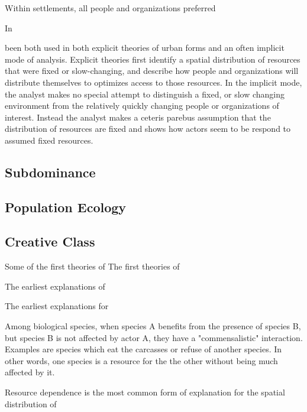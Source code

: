 Within settlements, all people and organizations
preferred 



In 



 been both used in both explicit theories of
urban forms and an often implicit mode of analysis. Explicit theories
first identify a spatial distribution of resources that were fixed or
slow-changing, and describe how people and organizations will
distribute themselves to optimizes access to those resources. In the
implicit mode, the analyst makes no special attempt to distinguish a
fixed, or slow changing environment from the relatively quickly
changing people or organizations of interest. Instead the analyst
makes a ceteris parebus assumption that the distribution of resources
are fixed and shows how actors seem to be respond to assumed fixed resources.



\subsection*{Subdominance}

\subsection*{Population Ecology}

\subsection*{Creative Class}

Some of the first theories of The first theories of 

The earliest explanations of 

The earliest explanations for 


Among biological species, when species A benefits from the presence of
species B, but species B is not affected by actor A, they have a
"commensalistic" interaction. Examples are species which eat the
carcasses or refuse of another species. In other words, one species is
a resource for the the other without being much affected by it. 

Resource dependence is the most common form of explanation for the
spatial distribution of



